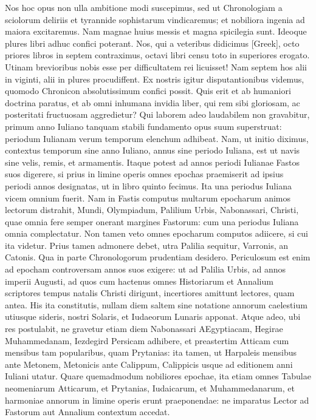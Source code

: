 Nos hoc opus non ulla ambitione
modi suscepimus, sed ut Chronologiam a sciolorum deliriis et tyrannide
sophistarum vindicaremus; et nobiliora ingenia ad maiora excitaremus.
Nam magnae huius messis et magna spicilegia sunt.
Ideoque
plures libri adhuc confici poterant.
Nos, qui a veteribus didicimus
\textgreek{[Greek]}, octo priores libros in septem contraximus,
octavi libri censu toto in superiores erogato.
Utinam brevioribus nobis esse per difficultatem rei licuisset!
Nam septem hos alii
in viginti, alii in plures procudiffent.
Ex nostris igitur disputantionibus
videmus, quomodo Chronicon absolutissimum confici possit.
Quis
erit et ab humaniori doctrina paratus, et ab omni inhumana invidia
liber, qui rem sibi gloriosam, ac posteritati fructuosam aggredietur?
Qui laborem adeo laudabilem non gravabitur, primum anno Iuliano
tanquam stabili fundamento opus suum superstruat: periodum Iulianam
verum temporum elenchum adhibeat.
Nam, ut initio diximus,
contextus temporum sine anno Iuliano, annus sine periodo Iuliana,
est ut navis sine velis, remis, et armamentis.
Itaque potest ad
annos periodi Iulianae Fastos suos digerere, si prius in limine operis
omnes epochas praemiserit ad ipsius periodi annos designatas, ut in
libro quinto fecimus.
Ita una periodus Iuliana vicem omnium fuerit.
Nam in Fastis computus multarum epocharum animos lectorum distrahit,
Mundi, Olympiadum, Palilium Urbis, Nabonassari, Christi,
quae omnia fere semper onerant margines Fastorum: cum una periodus
Iuliana omnia complectatur.
Non tamen veto omnes epocharum
computos adiicere, si cui ita videtur.
Prius tamen admonere debet,
utra Palilia sequitur, Varronis, an Catonis.
Qua in parte Chronologorum
prudentiam desidero.
Periculosum est enim ad epocham
controversam annos suos exigere: ut ad Palilia Urbis, ad annos imperii
Augusti, ad quos cum hactenus omnes Historiarum et Annalium
scriptores tempus natalis Christi dirigunt, incertiores amittunt
lectores, quam antea.
His ita constitutis, nullam diem saltem sine
notatione annorum caelestium utiusque sideris, nostri Solaris, et Iudaeorum
Lunaris apponat.
Atque adeo, ubi res postulabit, ne gravetur
etiam diem Nabonassari AEgyptiacam, Hegirae Muhammedanam,
Iezdegird Persicam adhibere, et preastertim Atticam cum mensibus
tam popularibus, quam Prytanias: ita tamen, ut Harpaleis mensibus
ante Metonem, Metonicis ante Calippum, Calippicis usque ad
editionem anni Iuliani utatur.
{}
Quare quemadmodum nobiliores epochae,
ita etiam omnes Tabulae neomeniarum Atticarum, et Prytanias,
Iudaicarum, et Muhammedanarum, et harmoniae annorum
in limine operis erunt praeponendae: ne imparatus Lector ad Fastorum
aut Annalium contextum accedat.

